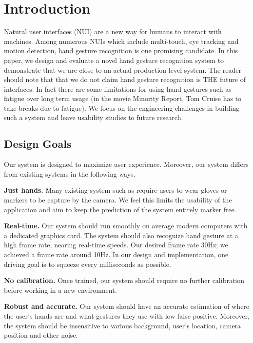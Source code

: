 \section{Introduction}
\label{sec: intro}
\cutsection

Natural user interfaces (NUI) are a new way for humans to interact with machines. Among numerous NUIs which include multi-touch, eye tracking and motion detection, hand gesture recognition is one promising candidate. In this paper, we design and evaluate a novel hand gesture recognition system to demonstrate that we are close to an actual production-level system. The reader should note that that we do not claim hand gesture recognition is THE future of interfaces. In fact there are some limitations for using hand gestures such as fatigue over long term usage (in the movie Minority Report, Tom Cruise has to take breaks due to fatigue). We focus on the engineering challenges in building such a system and leave usability studies to future research.

\cutsection
\subsection{Design Goals}
\cutsection
Our system is designed to maximize user experience. Moreover, our system differs from existing systems in the following ways.

\textbf{Just hands.} Many existing system such as \cite{mistry, wang2009} require users to wear gloves or markers to be capture by the camera. We feel this limits the usability of the application and aim to keep the prediction of the system entirely marker free.
  
\textbf{Real-time.} Our system should run smoothly on average modern computers with a dedicated graphics card. The system should also recognize hand gesture at a high frame rate, nearing real-time speeds. Our desired frame rate 30Hz; we achieved a frame rate around 10Hz. In our design and implementation, one driving goal is to squeeze every milliseconds as possible. 

\textbf{No calibration.}  Once trained, our system should require no further calibration before working in a new environment. 

\textbf{Robust and accurate.} Our system should have an accurate estimation of where the user's hands are and what gestures they use with low false positive. Moreover, the system should be insensitive to various background, user's location, camera position and other noise. 

